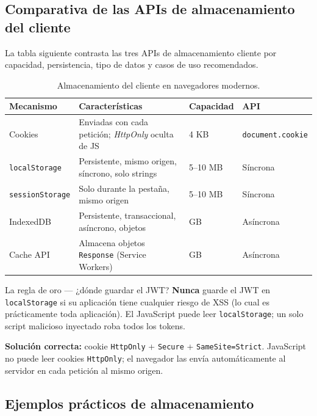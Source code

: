 \documentclass[11pt,a4paper,openany]{book}
\begin{document}
\subsection{Comparativa de las APIs de almacenamiento del cliente}

La tabla siguiente contrasta las tres APIs de almacenamiento
cliente por capacidad, persistencia, tipo de datos y casos de uso
recomendados.


\begin{table}[htbp]
\centering
\caption{Almacenamiento del cliente en navegadores modernos.}
\footnotesize
\begin{tabularx}{\textwidth}{lXll}
\toprule
\textbf{Mecanismo} & \textbf{Características} & \textbf{Capacidad} & \textbf{API}\\
\midrule
Cookies & Enviadas con cada petición; \emph{HttpOnly} oculta de JS & 4 KB & \texttt{document.cookie}\\
\texttt{localStorage} & Persistente, mismo origen, síncrono, solo strings & 5--10 MB & Síncrona\\
\texttt{sessionStorage} & Solo durante la pestaña, mismo origen & 5--10 MB & Síncrona\\
IndexedDB & Persistente, transaccional, asíncrono, objetos & GB & Asíncrona\\
Cache API & Almacena objetos \texttt{Response} (Service Workers) & GB & Asíncrona\\
\bottomrule
\end{tabularx}
\end{table}

\begin{cajaadvertencia}{La regla de oro --- ¿dónde guardar el JWT?}
\textbf{Nunca} guarde el JWT en \texttt{localStorage} si su aplicación
tiene cualquier riesgo de XSS (lo cual es prácticamente toda
aplicación). El JavaScript puede leer \texttt{localStorage}; un solo
script malicioso inyectado roba todos los tokens.

\textbf{Solución correcta:} cookie \texttt{HttpOnly} + \texttt{Secure}
+ \texttt{SameSite=Strict}. JavaScript no puede leer cookies
\texttt{HttpOnly}; el navegador las envía automáticamente al servidor
en cada petición al mismo origen.
\end{cajaadvertencia}

\subsection{Ejemplos prácticos de almacenamiento}
\end{document}
